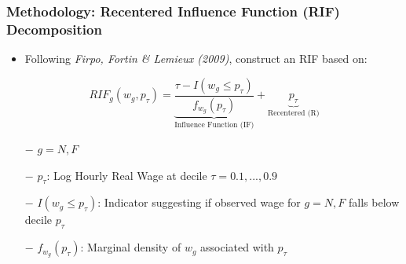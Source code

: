 \documentclass[10pt]{beamer}
\begin{document}
\begin{frame} 
	\frametitle{Methodology: Recentered Influence Function (RIF) Decomposition}
	
	\begin{itemize}
		\item Following \textit{Firpo, Fortin \& Lemieux (2009)}, construct an RIF based on:
	\end{itemize}
	
	\begin{equation} \label{rif_def}
	RIF_{g}(w_{g},p_{\tau}) = \underbrace{\frac{\tau - I(w_{g} \leq p_{\tau})}{f_{w_{g}} (p_{\tau})}}_\text{Influence Function (IF)} + \underbrace{p_{\tau}}_\text{Recentered (R)}
	\end{equation} 
	
	
	\begin{itemize}
		\item[$-$]$g=N, F$ \\
		\item[$-$]$p_{\tau}$: Log Hourly Real Wage at decile $\tau = 0.1, ..., 0.9$
		\item[$-$]$I(w_{g} \leq p_{\tau})$: Indicator suggesting if observed wage for $g=N, F$ falls below decile $p_{\tau}$  \\
		\item[$-$]${f_{w_{g}} (p_{\tau})}$: Marginal density of $w_{g}$ associated with $p_{\tau}$ \\
		
		
	\end{itemize}
	
	\bigskip
	
	
	
	
	
\end{frame}

\end{document}
